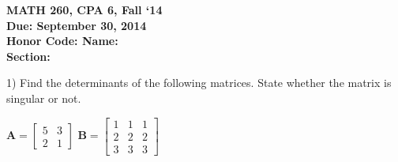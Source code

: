 \documentclass{article}
\begin{document}
\begin{flushleft}
	\bfseries{MATH 260, CPA 6, Fall `14}\\
	\bfseries{Due: September 30, 2014}\\
	\bfseries{Honor Code:} \hspace{3.5in}\bfseries{Name:}\\
	\hspace{4.37in}\bfseries{Section:}
\end{flushleft}
\vspace{.25in}
\begin{flushleft}

1) Find the determinants of the following matrices.  State whether the matrix is singular or not.

\begin{center}
$\textbf{A}=\left[
\begin{array}{cc}
5 & 3\\
2 & 1
\end{array}
\right]
$
\hspace{0.1in}
$\textbf{B}=\left[
\begin{array}{ccc}
1 & 1 & 1\\
2 & 2 & 2\\
3 & 3 & 3
\end{array}
\right]
$
\end{center}

\end{flushleft}
\end{document}
